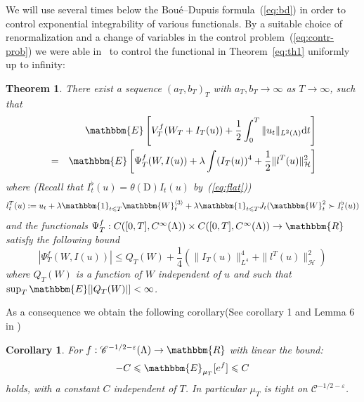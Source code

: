 \documentclass[11pt]{article}
\newcommand{\assign}{:=}
\newcommand{\mathD}{\mathrm{D}}
\newcommand{\mathd}{\mathrm{d}}
\newtheorem{corollary}{Corollary}
\newtheorem{theorem}{Theorem}
\newcommand{\VV}{\mathscr{C}}
\begin{document}
We will use several times below the Bou{\'e}--Dupuis formula~(\ref{eq:bd}) in
order to control exponential integrability of various functionals. By a
suitable choice of renormalization and a change of variables in the control
problem~(\ref{eq:contr-prob}) we were able
in~{\cite{barashkov_gubinelli_variational}} to control the functional in
Theorem~\ref{eq:th1} uniformly up to infinity:

\begin{theorem}
  \label{thm:equicoerc}There exist a sequence $(a_T, b_T)_T$ with $a_T, b_T
  \rightarrow \infty$ as $T \rightarrow \infty$, such that
  \begin{eqnarray*}
    &  & \mathbbm{E} \left[ V^f_T (W_T + I_T (u)) + \frac{1}{2} \int^T_0 \|
    u_t \|_{L^2 (\Lambda)} \mathd t \right]\\
    & = & \mathbbm{E} \left[ \Psi^f_T (W, I (u)) + \lambda \int (I_T (u))^4 +
    \frac{1}{2} \| l^T (u) \|_{\mathcal{H}}^2 \right]
  \end{eqnarray*}
  where (Recall that $I_t^{\flat} (u) = \theta (\mathD) I_t (u)$
  by~(\ref{eq:flat}))
  \begin{equation}
    l_t^T (u) \assign u_t + \lambda \mathbbm{1}_{t \leqslant T}
    \mathbbm{W}^{\langle 3 \rangle}_t + \lambda \mathbbm{1}_{t \leqslant T}
    J_t (\mathbbm{W}_t^2 \succ I_t^{\flat} (u)) \label{eq:renorm-drift}
  \end{equation}
  and the functionals $\Psi^f_T : C ([0, T], C^{\infty} (\Lambda)) \times C
  ([0, T], C^{\infty} (\Lambda)) \rightarrow \mathbbm{R}$ satisfy the
  following bound
  \[ | \Psi^f_T (W, I (u)) | \leqslant Q_T (W) + \frac{1}{4} (\| I_T (u)
     \|^4_{L^4} + \| l^T (u) \|_{\mathcal{H}}^2) \]
  where $Q_T (W)$ is a function of $W$ independent of $u$ and such that
  $\sup_T \mathbbm{E} [| Q_T (W) |] < \infty$.
\end{theorem}

As a consequence we obtain the following corollary(See corollary 1 and Lemma 6
in {\cite{barashkov_gubinelli_variational}})

\begin{corollary}
  \label{cor:tightness}For $f : \VV^{- 1 / 2 - \varepsilon} (\Lambda)
  \rightarrow \mathbbm{R}$ with linear the bound:
  \[ - C \leqslant \mathbbm{E}_{\mu_T} [e^f] \leqslant C \]
  holds, with a constant $C$ independent of $T$. In particular $\mu_T$ is
  tight on $\VV^{- 1 / 2 - \varepsilon}$.
\end{corollary}

\
\end{document}
